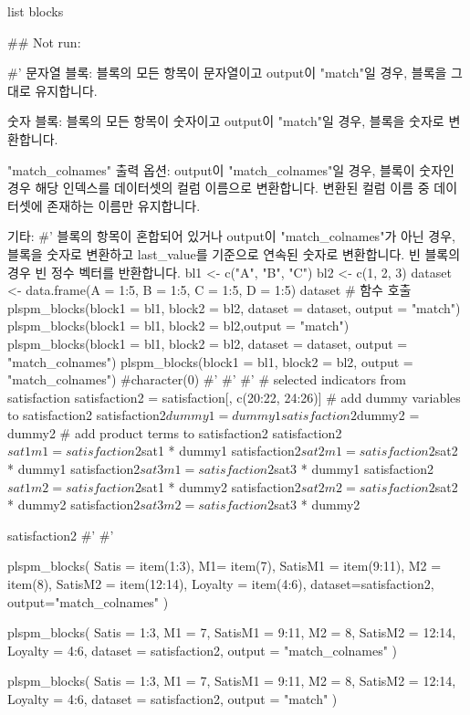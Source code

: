 \documentclass[a4paper]{book}
\begin{document}
%
\begin{Value}
list blocks
\end{Value}
%
\begin{Examples}
\begin{ExampleCode}

## Not run: 

#'
문자열 블록:
  블록의 모든 항목이 문자열이고 output이 "match"일 경우,
   블록을 그대로 유지합니다.

숫자 블록:
  블록의 모든 항목이 숫자이고 output이 "match"일 경우,
  블록을 숫자로 변환합니다.

"match_colnames" 출력 옵션:
  output이 "match_colnames"일 경우, 블록이 숫자인
  경우 해당 인덱스를 데이터셋의 컬럼 이름으로
  변환합니다. 변환된 컬럼 이름 중 데이터셋에
  존재하는 이름만 유지합니다.

기타:
#'   블록의 항목이 혼합되어 있거나 output이
"match_colnames"가 아닌 경우, 블록을 숫자로
변환하고 last_value를 기준으로 연속된 숫자로
변환합니다. 빈 블록의 경우 빈 정수 벡터를
반환합니다.
bl1 <- c("A", "B", "C")
bl2 <- c(1, 2, 3)
dataset <- data.frame(A = 1:5, B = 1:5, C = 1:5, D = 1:5)
dataset
# 함수 호출
plspm_blocks(block1 = bl1, block2 = bl2,
dataset = dataset, output = "match")
plspm_blocks(block1 = bl1, block2 = bl2,output = "match")
plspm_blocks(block1 = bl1, block2 = bl2,
dataset = dataset, output = "match_colnames")
plspm_blocks(block1 = bl1, block2 = bl2,
output = "match_colnames") #character(0)
#'
#'
#'
# selected indicators from satisfaction
satisfaction2 = satisfaction[, c(20:22, 24:26)]
# add dummy variables to satisfaction2
satisfaction2$dummy1 = dummy1
satisfaction2$dummy2 = dummy2
# add product terms to satisfaction2
satisfaction2$sat1m1 = satisfaction2$sat1 * dummy1
satisfaction2$sat2m1 = satisfaction2$sat2 * dummy1
satisfaction2$sat3m1 = satisfaction2$sat3 * dummy1
satisfaction2$sat1m2 = satisfaction2$sat1 * dummy2
satisfaction2$sat2m2 = satisfaction2$sat2 * dummy2
satisfaction2$sat3m2 = satisfaction2$sat3 * dummy2

satisfaction2 %
#'
#'

plspm_blocks(
  Satis = item(1:3),
  M1= item(7),
  SatisM1 = item(9:11),
  M2 = item(8),
  SatisM2 = item(12:14),
  Loyalty = item(4:6),
  dataset=satisfaction2,
  output="match_colnames"
)


plspm_blocks(
  Satis = 1:3,
  M1 = 7,
  SatisM1 = 9:11,
  M2 = 8,
  SatisM2 = 12:14,
  Loyalty = 4:6,
  dataset = satisfaction2,
  output = "match_colnames"
)

plspm_blocks(
  Satis = 1:3,
  M1 = 7,
  SatisM1 = 9:11,
  M2 = 8,
  SatisM2 = 12:14,
  Loyalty = 4:6,
  dataset = satisfaction2,
  output = "match"
)




\end{ExampleCode}
\end{Examples}
\end{document}
